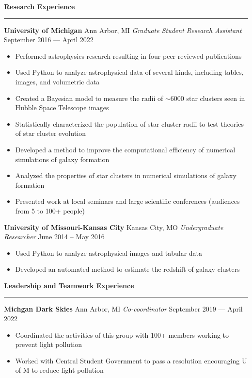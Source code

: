 \documentclass[10pt]{article}
\newcommand{\header}[1]{\vspace{1.5em}\par \textbf{\large #1}\strut\hrule\vspace{-0.9em}}
\newcommand{\actionHeader}[2]{\vspace{0.6em}\textbf{#1} \hfill #2}
\newcommand{\actionHeaderSecondLine}[2]{\newline \textit{#1} \hfill #2}
\begin{document}
\header{Research Experience}
\actionHeader{University of Michigan}{Ann Arbor, MI}
\actionHeaderSecondLine{Graduate Student Research Assistant}{September 2016 --- April 2022}
\begin{itemize}
    \item Performed astrophysics research resulting in four peer-reviewed publications
    \item Used Python to analyze astrophysical data of several kinds, including tables, images, and volumetric data
    \item Created a Bayesian model to measure the radii of $\sim$6000 star clusters seen in Hubble Space Telescope images 
    \item Statistically characterized the population of star cluster radii to test theories of star cluster evolution
    \item Developed a method to improve the computational efficiency of numerical simulations of galaxy formation
    \item Analyzed the properties of star clusters in numerical simulations of galaxy formation
    \item Presented work at local seminars and large scientific conferences (audiences from 5 to 100+ people)
\end{itemize}

\actionHeader{University of Missouri-Kansas City}{Kansas City, MO}
\actionHeaderSecondLine{Undergraduate Researcher}{June 2014 -- May 2016} 
\begin{itemize}
    \item Used Python to analyze astrophysical images and tabular data
    \item Developed an automated method to estimate the redshift of galaxy clusters
\end{itemize}

\header{Leadership and Teamwork Experience}
\actionHeader{Michgan Dark Skies}{Ann Arbor, MI}
\actionHeaderSecondLine{Co-coordinator}{September 2019 --- April 2022}
\begin{itemize}
    \item Coordinated the activities of this group with 100+ members working to prevent light pollution
    \item Worked with Central Student Government to pass a resolution encouraging U of M to reduce light pollution
\end{itemize}
\end{document}
